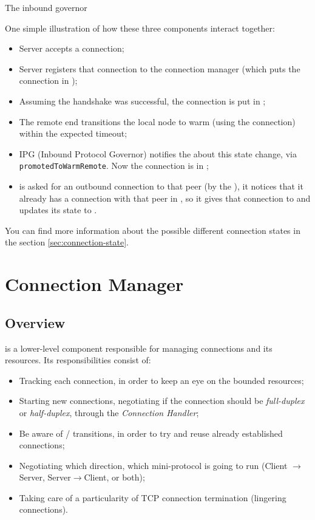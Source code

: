 The inbound governor 

One simple illustration of how these three components interact together:

\begin{itemize}
    \item Server accepts a connection;
    \item Server registers that connection to the connection manager (which puts the
      connection in \UnnegotiatedStateIn{});
    \item Assuming the handshake was successful, the connection is put in
      \InboundIdleStateDup{};
    \item The remote end transitions the local node to warm (using the connection) within the expected timeout;
    \item IPG (Inbound Protocol Governor) notifies the \Connmngr{} about this state
      change, via \texttt{promotedToWarmRemote}. Now the connection is
      in \InboundStateDup{};
    \item \Connmngr{} is asked for an outbound connection to that peer (by the \ptopgov{}), it notices
      that it already has a connection with that peer in \InboundStateDup{}, so it gives
      that connection to \ptopgov{} and updates its state to \DuplexState{}.
\end{itemize}

You can find more information about the possible different connection states in the section
\ref{sec:connection-state}.

\section{Connection Manager}

\subsection{Overview}

\Connmngr{} is a lower-level component responsible for managing connections and its
resources. Its responsibilities consist of:

\begin{itemize}
    \item Tracking each connection, in order to keep an eye on the bounded resources;
    \item Starting new connections, negotiating if the connection should be
      \emph{full-duplex} or \emph{half-duplex}, through the \emph{Connection Handler};
    \item Be aware of \warm{}/\hot{} transitions, in order to try and reuse already established
      connections;
    \item Negotiating which direction, which mini-protocol is going to run
      (Client $\rightarrow$ Server, Server$\rightarrow$Client, or both);
    \item Taking care of a particularity of TCP connection termination (lingering
      connections).
\end{itemize}

